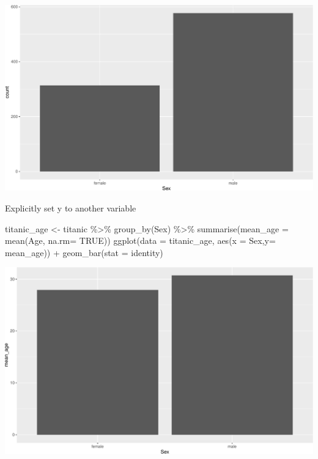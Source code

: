 \documentclass[
]{book}
\newenvironment{Shaded}{\begin{snugshade}}{\end{snugshade}}
\newcommand{\AttributeTok}[1]{\textcolor[rgb]{0.77,0.63,0.00}{#1}}
\newcommand{\ConstantTok}[1]{\textcolor[rgb]{0.00,0.00,0.00}{#1}}
\newcommand{\FunctionTok}[1]{\textcolor[rgb]{0.00,0.00,0.00}{#1}}
\newcommand{\NormalTok}[1]{#1}
\newcommand{\OtherTok}[1]{\textcolor[rgb]{0.56,0.35,0.01}{#1}}
\newcommand{\SpecialCharTok}[1]{\textcolor[rgb]{0.00,0.00,0.00}{#1}}
\newcommand{\StringTok}[1]{\textcolor[rgb]{0.31,0.60,0.02}{#1}}
\begin{document}
\includegraphics{figures/unnamed-chunk-141-1.pdf}

Explicitly set y to another variable

\begin{Shaded}
\begin{Highlighting}[]
\NormalTok{titanic\_age }\OtherTok{\textless{}{-}}\NormalTok{ titanic }\SpecialCharTok{\%\textgreater{}\%} \FunctionTok{group\_by}\NormalTok{(Sex) }\SpecialCharTok{\%\textgreater{}\%} \FunctionTok{summarise}\NormalTok{(}\AttributeTok{mean\_age =} \FunctionTok{mean}\NormalTok{(Age, }\AttributeTok{na.rm=} \ConstantTok{TRUE}\NormalTok{))}
\FunctionTok{ggplot}\NormalTok{(}\AttributeTok{data =}\NormalTok{ titanic\_age, }\FunctionTok{aes}\NormalTok{(}\AttributeTok{x =}\NormalTok{ Sex,}\AttributeTok{y=}\NormalTok{ mean\_age)) }\SpecialCharTok{+} \FunctionTok{geom\_bar}\NormalTok{(}\AttributeTok{stat =} \StringTok{\textquotesingle{}identity\textquotesingle{}}\NormalTok{)}
\end{Highlighting}
\end{Shaded}

\includegraphics{figures/unnamed-chunk-142-1.pdf}
\end{document}
